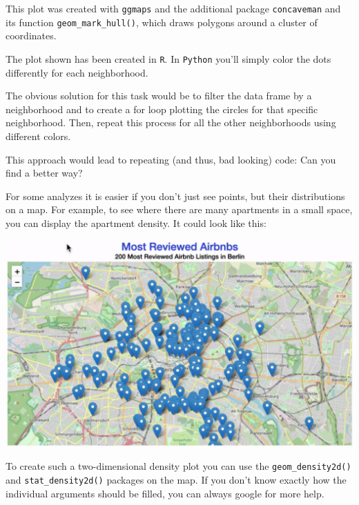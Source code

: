 \documentclass[
  11pt,
]{article}
\newenvironment{tips}[1]
  {
  \begin{itemize}
  \footnotesize
  \renewcommand{\labelitemi}{
    \raisebox{-.7\height}[0pt][0pt]{
      {\setkeys{Gin}{width=3em,keepaspectratio}
        \texttt{[image: images/\#1.png]}}
    }
  }
  \setlength{\fboxsep}{1em}
  \begin{rbox}
  \item
  }
  {
  \end{rbox}
  \end{itemize}
  }
\newenvironment{tipsp}[1]
  {
  \begin{itemize}
  \footnotesize
  \renewcommand{\labelitemi}{
    \raisebox{-.7\height}[0pt][0pt]{
      {\setkeys{Gin}{width=3em,keepaspectratio}
        \texttt{[image: images/\#1.png]}}
    }
  }
  \setlength{\fboxsep}{1em}
  \begin{pbox}
  \item
  }
  {
  \end{pbox}
  \end{itemize}
  }
\begin{document}
\begin{tips}r
This plot was created with \texttt{ggmaps} and the additional package \texttt{concaveman} and its function \texttt{geom\_mark\_hull()}, which draws polygons around a cluster of coordinates.

\end{tips}

\begin{tipsp}p
The plot shown has been created in \texttt{R}. In \texttt{Python} you'll simply color the dots differently for each neighborhood.

The obvious solution for this task would be to filter the data frame by a neighborhood and to create a for loop plotting the circles for that specific neighborhood. Then, repeat this process for all the other neighborhoods using different colors.

This approach would lead to repeating (and thus, bad looking) code: Can you find a better way?

\end{tipsp}

For some analyzes it is easier if you don't just see points, but their distributions on a map. For example, to see where there are many apartments in a small space, you can display the apartment density. It could look like this:

\begin{center}\includegraphics[width=1\linewidth]{plot/01_python/map_popup} \end{center}

\begin{tips}r
To create such a two-dimensional density plot you can use the \texttt{geom\_density2d()} and \texttt{stat\_density2d()} packages on the map. If you don't know exactly how the individual arguments should be filled, you can always google for more help.

\end{tips}
\end{document}
